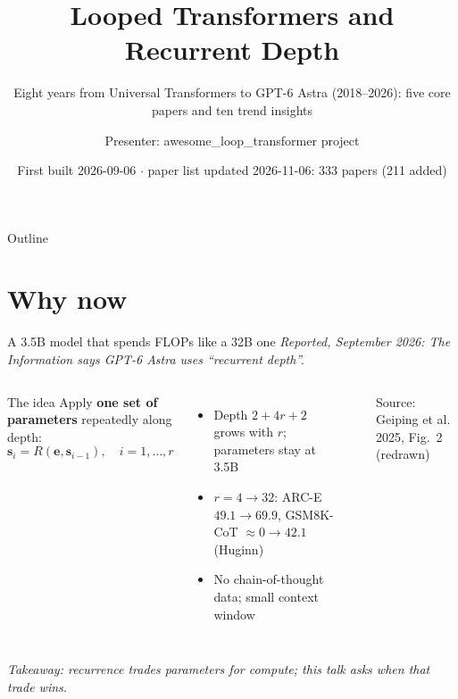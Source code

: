 \documentclass[aspectratio=169,10pt]{beamer}
\title[Looped Transformers \& Recurrent Depth]{Looped Transformers and Recurrent Depth}
\subtitle{Eight years from Universal Transformers to GPT-6 Astra (2018--2026): five core papers and ten trend insights}
\author{Presenter: awesome\_loop\_transformer project}
\institute{github.com/asimfish/awesome\_loop\_transformer}
\date[2026-11-06]{First built 2026-09-06 $\cdot$ paper list updated 2026-11-06: 333 papers (211 added)}
\newcommand{\HL}[1]{\textcolor{emphasis}{#1}}
\begin{document}
\begin{frame}
  \titlepage
\end{frame}

\begin{frame}{Outline}
  \tableofcontents
\end{frame}

\section{Why now}

\begin{frame}{A 3.5B model that spends FLOPs like a 32B one}
  \textit{Reported, September 2026: The Information says GPT-6 Astra uses ``recurrent depth''.}
  \begin{columns}[T]
      \begin{block}{The idea}
        Apply \textbf{one set of parameters} repeatedly along depth:
        \[ \mathbf{s}_i = R(\mathbf{e}, \mathbf{s}_{i-1}), \quad i = 1,\dots,r \]
      \end{block}
      \begin{itemize}
        \item Depth $2 + 4r + 2$ grows with $r$; parameters stay at 3.5B
        \item $r{=}4 \to 32$: ARC-E $49.1 \to 69.9$, GSM8K-CoT $\approx 0 \to 42.1$ (Huginn)
        \item No chain-of-thought data; small context window
      \end{itemize}
      \begin{center}
      \end{center}
      {\small Source: Geiping et al. 2025, Fig.~2 (redrawn)}
  \end{columns}
  \textit{Takeaway: recurrence trades parameters for compute; this talk asks \HL{when that trade wins}.}
\end{frame}
\end{document}
